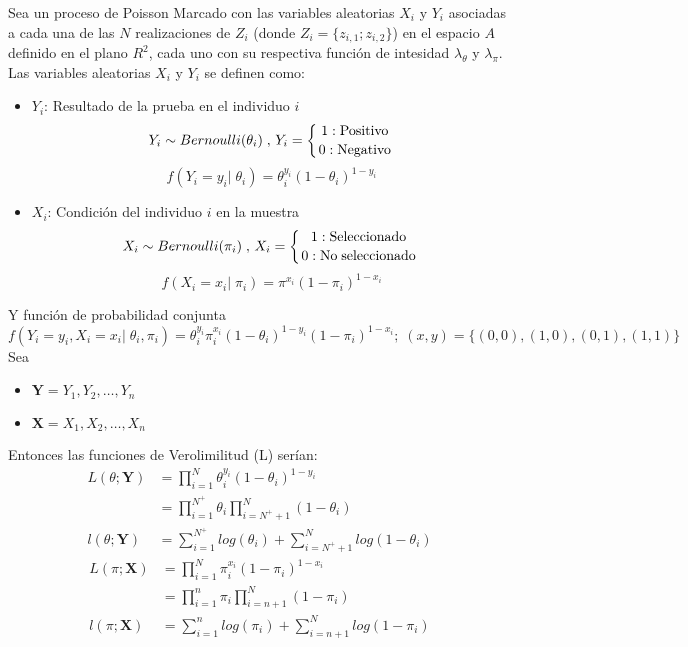 \documentclass[12pt,a4paper,oneside]{report}
\begin{document}
Sea un  proceso de Poisson Marcado con las variables aleatorias  $X_i$ y $Y_i$ asociadas a cada una de las $N$ realizaciones de $Z_i$ (donde $Z_i=\{z_{i,1};z_{i,2}\}$) en el espacio $A$ definido en el plano $R^2$, cada uno con su respectiva función de intesidad $\lambda_\theta$ y $\lambda_\pi$. Las variables aleatorias  $X_i$ y $Y_i$ se definen como:
\begin{itemize}
    \item[] $Y_i$: Resultado de la prueba en el individuo $i$\\
    $$Y_i \sim Bernoulli(\theta_i) \; , \,Y_i = \left\{ 1: \mathrm{Positivo}\atop 0: \mathrm{Negativo} \right. $$
    $$f(Y_i=y_i|\;\theta_i) = \theta_i^{y_i} (1-\theta_i)^{1-y_i}$$
    \item[] $X_i$: Condición del individuo $i$ en la muestra\\
    $$X_i \sim Bernoulli(\pi_i) \; , \, X_i = \left\{ 1: \mathrm{Seleccionado} \atop 0: \mathrm{No \; seleccionado} \right.$$
    $$f(X_i=x_i|\;\pi_i) = \pi^{x_i} (1-\pi_i)^{1-x_i}$$
\end{itemize}
Y función de probabilidad conjunta
\begin{equation*}
    f(Y_i=y_i,X_i=x_i|\;\theta_i,\pi_i) = \theta_i^{y_i} \pi_i^{x_i} (1-\theta_i)^{1-y_i} (1-\pi_i)^{1-x_i}; \; (x,y)=\{(0,0),(1,0),(0,1),(1,1)\}
\end{equation*}
Sea
\begin{itemize}
    \item[] $\textbf{Y} = Y_1,Y_2,\dots,Y_n$
    \item[] $\textbf{X} = X_1,X_2,\dots,X_n$
\end{itemize}
Entonces las funciones de Verolimilitud (L) serían:
\begin{align*}
L(\theta;\textbf{Y}) &=  \prod_{i=1}^N \theta_i^{y_i} (1-\theta_i)^{1-y_i}\\
&= \prod_{i=1}^{N^+} \theta_i \prod_{i=N^++1}^N(1-\theta_i)\\
l(\theta;\textbf{Y}) &= \sum_{i=1}^{N^+} log (\theta_i) + \sum_{i=N^++1}^N log(1-\theta_i)
\end{align*}
\begin{align*}
L(\pi;\textbf{X}) &=  \prod_{i=1}^N \pi_i^{x_i} (1-\pi_i)^{1-x_i}\\
&= \prod_{i=1}^{n} \pi_i \prod_{i=n+1}^N(1-\pi_i)\\
l(\pi;\textbf{X}) &= \sum_{i=1}^{n} log (\pi_i) + \sum_{i=n+1}^N log(1-\pi_i)
\end{align*}
\end{document}
